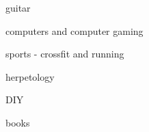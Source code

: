 
\begin{cvitems} %
\item{guitar}
\item{computers and computer gaming}
\item{sports - crossfit and running}
\item{herpetology}
\item{DIY}
\item{books}
\end{cvitems}
